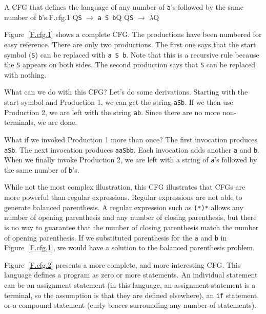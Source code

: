 \documentclass[letterpaper,12pt,openany,reqno]{book}%
\newcommand{\code}[1] {\lstinline[breaklines=yes,breakatwhitespace=yes]{#1}}
\newcommand{\cfgprod}[2] {\texttt{#1} $\rightarrow$ \texttt{#2}}
\begin{document}
\begin{cfg}{A CFG that defines the language of any number of \code{a}'s followed by the same number of \code{b}'s.}{F.cfg.1}
Q\cfgprod{S}{a S b}Q
Q\cfgprod{S}{$\lambda$}Q
\end{cfg}

Figure~\ref{F.cfg.1} shows a complete CFG. The productions have been numbered for easy reference. There are only two productions. The first one says that the start symbol (\code{S}) can be replaced with \code{a S b}. Note that this is a recursive rule because the \code{S} appears on both sides. The second production says that \code{S} can be replaced with nothing.

What can we do with this CFG? Let's do some derivations. Starting with the start symbol and Production 1, we can get the string \code{aSb}. If we then use Production 2, we are left with the string \code{ab}. Since there are no more non-terminals, we are done.

What if we invoked Production 1 more than once? The first invocation produces \code{aSb}. The next invocation produces \code{aaSbb}. Each invocation adds another \code{a} and \code{b}. When we finally invoke Production 2, we are left with a string of \code{a}'s followed by the same number of \code{b}'s.

While not the most complex illustration, this CFG illustrates that CFGs are more powerful than regular expressions. Regular expressions are not able to generate balanced parenthesis. A regular expression such as \code{(*)*} allows any number of opening parenthesis and any number of closing parenthesis, but there is no way to guarantee that the number of closing parenthesis match the number of opening parenthesis. If we substituted parenthesis for the \code{a} and \code{b} in Figure~\ref{F.cfg.1}, we would have a solution to the balanced parenthesis problem.

Figure~\ref{F.cfg.2} presents a more complete, and more interesting CFG. This language defines a program as zero or more statements. An individual statement can be an assignment statement (in this language, an assignment statement is a terminal, so the assumption is that they are defined elsewhere), an \code{if} statement, or a compound statement (curly braces surrounding any number of statements). 
\end{document}
